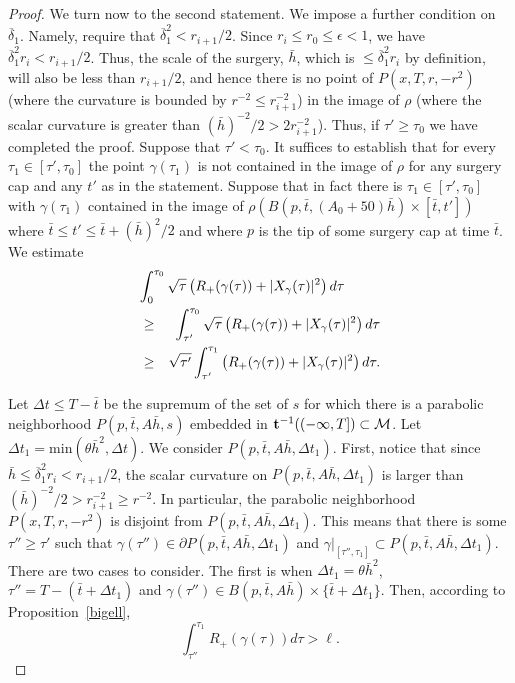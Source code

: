 \begin{proof}
We turn now to the second statement. We impose a further condition
on $\overline\delta_1$. Namely, require that
$\overline\delta_1^2<r_{i+1}/2$. Since $r_{i}\le r_0\le \epsilon<1$,
we have $\overline\delta_1^2r_i<r_{i+1}/2$. Thus, the scale of the
surgery, $\bar h$, which is $\le \overline\delta_1^2r_i$ by
definition, will also be less than $r_{i+1}/2$, and hence there is
no point of $P(x,T,r,-r^2)$ (where the curvature is bounded by
$r^{-2}\le r_{i+1}^{-2}$) in the image of $\rho$ (where the scalar
curvature is greater than $(\bar h)^{-2}/2>2r_{i+1}^{-2}$). Thus, if
$\tau'\ge \tau_0$ we have completed the proof. Suppose that
$\tau'<\tau_0$. It suffices to establish that for every $\tau_1\in
[\tau',\tau_0]$ the point $\gamma(\tau_1)$ is not contained in the
image of $\rho$ for any surgery cap and any $t'$ as in the
statement. Suppose that in fact there is $\tau_1\in [\tau', \tau_0]$
with $\gamma(\tau_1)$ contained in the image of $\rho(B(p,\bar
t,(A_0+50)\bar h)\times [\bar t,t'])$ where $\bar t\le t'\le \bar
t+(\bar h)^2/2$ and where $p$ is the tip
 of some surgery cap at time $\bar t$. We estimate
\begin{eqnarray}\nonumber
\lefteqn{\int_0^{\tau_0}\sqrt{\tau}\left(R_+(\gamma(\tau))+|X_\gamma(\tau)|^2\right)d\tau} & & \\
& \ge &
\int_{\tau'}^{\tau_0}\sqrt{\tau}\left(R_+(\gamma(\tau))+|X_\gamma(\tau)|^2\right)d\tau
\nonumber
\\ & \ge &
\sqrt{\tau'}\int_{\tau'}^{\tau_1}\left(R_+(\gamma(\tau))+|X_\gamma(\tau)|^2\right)d\tau.
\label{tau_1est}
\end{eqnarray}

 Let $\Delta t\le
T-\bar t$ be the supremum of the set of $s$ for which there is a
parabolic neighborhood $P(p,\bar t,A\bar h,s)$ embedded in ${\bf
t}^{-1}((-\infty,T])\subset {\mathcal M}$. Let $\Delta t_1=\mathrm{min}(\theta \bar h^2,\Delta t)$. We consider $P(p,\bar t,A\bar
h,\Delta t_1)$. First, notice that since $\bar h\le
\overline\delta_1^2r_{i}<r_{i+1}/2$,
the scalar curvature on $P(p,\bar
t,A\bar h,\Delta t_1)$ is larger than $(\bar
h)^{-2}/2>r_{i+1}^{-2}\ge r^{-2}$. In particular, the parabolic
neighborhood $P(x,T,r,-r^2)$ is disjoint from $P(p,\bar t,A\bar
h,\Delta t_1)$. This means that there is some $\tau''\ge \tau'$ such
that $\gamma(\tau'')\in
\partial P(p,\bar t,A\bar h,\Delta t_1)$ and $\gamma|_{[\tau'',\tau_1]}\subset
P(p,\bar t,A\bar h,\Delta t_1)$. There are two cases to consider.
The first is when $\Delta t_1=\theta \bar h^2$, $\tau''=T-(\bar
t+\Delta t_1)$ and $\gamma(\tau'')\in B(p,\bar t,A\bar
h)\times\{\bar t+\Delta t_1\}$. Then, according to
Proposition~\ref{bigell},
\begin{equation}\label{**}
\int_{\tau''}^{\tau_1}R_+(\gamma(\tau))d\tau> \ell.\end{equation}


\end{proof}
